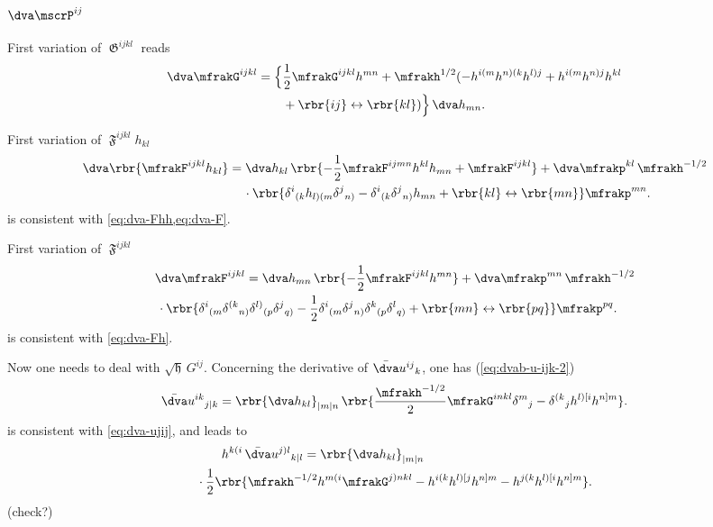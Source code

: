 \documentclass[a4paper,11pt]{article}
\begin{document}
\subsubsection{$\dva\mscrP^{ij}$}


First variation of $\mfrakG^{ijkl}$ reads
\begin{align}
\dva \mfrakG^{ijkl} &= \Big\{\frac{1}{2}\mfrakG^{ijkl}h^{mn}
+ \mfrakh^{1/2}(-h^{i(m}h^{n)(k}h^{l)j} + h^{i(m}h^{n)j}h^{kl}
\nonumber \\
&\qquad+
\rbr{ij} \leftrightarrow \rbr{kl} ) \Big\} \,\dva h_{mn}.
\end{align}

First variation of $\mfrakF^{ijkl}h_{kl}$
\begin{align}
\dva\rbr{\mfrakF^{ijkl}h_{kl}} &= \dva h_{kl}\,
\rbr{-\frac{1}{2}\mfrakF^{ijmn}h^{kl}h_{mn}+\mfrakF^{ijkl}}
+
\dva \mfrakp^{kl} \, \mfrakh^{-1/2}
\nonumber \\
&\quad\,\cdot
\rbr{\delta^{i}{}_{(k}h_{l)(m}\delta^{j}{}_{n)}-
\delta^{i}{}_{(k}\delta^{j}{}_{n)}h_{mn} 
+ \rbr{kl}\leftrightarrow\rbr{mn}}
\mfrakp^{mn}.
\label{eq:dva-Fh}
\end{align}
 is consistent with \cref{eq:dva-Fhh,eq:dva-F}.

First variation of $\mfrakF^{ijkl}$
\begin{align}
&\dva\mfrakF^{ijkl} = \dva h_{mn}\,\rbr{-\frac{1}{2}\mfrakF^{ijkl}h^{mn}}
+\dva\mfrakp^{mn}\,\mfrakh^{-1/2}
\nonumber \\
&\,\cdot \rbr{
\delta^{i}{}_{(m} \delta^{(k}{}_{n)} \delta^{l)}{}_{(p} \delta^{j}{}_{q)} -
\frac{1}{2}
\delta^{i}{}_{(m} \delta^{j}{}_{n)} \delta^{k}{}_{(p} \delta^{l}{}_{q)}
+\rbr{mn}\leftrightarrow\rbr{pq}}\mfrakp^{pq}.
\label{eq:dva-F}
\end{align}
 is consistent with \cref{eq:dva-Fh}.

Now one needs to deal with $\sqrt{\mfrakh}\,G^{ij}$. Concerning the derivative 
of $\bar{\dva}u^{ij}{}_k$, one has (\cref{eq:dvab-u-ijk-2})
\begin{align}
\bar{\dva}u^{ik}{}_{j|k} =
\rbr{\dva h_{kl}}_{|m|n}\,
\rbr{\frac{\mfrakh^{-1/2}}{2} \mfrakG^{inkl} \delta^m{}_j
- \delta^{(k}{}_{j}h^{l)[i}h^{n]m}}.
\label{eq:dva-uikj|k}
\end{align}
 is consistent with \cref{eq:dva-ujij}, and leads to
\begin{align}
&\qquad
h^{k(i}\,\bar{\dva}u^{j)l}{}_{k|l} =
\rbr{\dva h_{kl}}_{|m|n}
\nonumber \\
&\cdot
\frac{1}{2}\rbr{ \mfrakh^{-1/2} h^{m(i}\mfrakG^{j)nkl}
- h^{i(k}h^{l)[j}h^{n]m} - h^{j(k}h^{l)[i}h^{n]m}}.
\label{eq:hki-dva-ujlk|l}
\end{align}
(check?)
\end{document}
